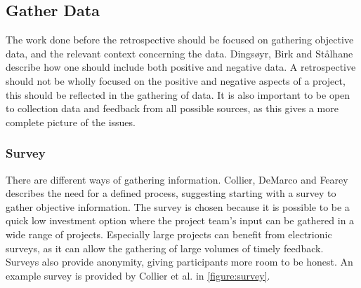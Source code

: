 \documentclass[12pt]{article}
\begin{document}
\subsection{Gather Data}
The work done before the retrospective should be focused on gathering objective data, and the relevant context concerning the data. Dingsøyr, Birk and Stålhane~\cite{Moe2001}  describe how one should include both positive and negative data. A retrospective should not be wholly focused on the positive and negative aspects of a project, this should be reflected in the gathering of data. It is also important to be open to collection data and feedback from all possible sources, as this gives a more complete picture of the issues.

\subsubsection{Survey} There are different ways of gathering information. Collier, DeMarco and Fearey~\cite{Collier1996} describes the need for a defined process, suggesting starting with a survey to gather objective information. The survey is chosen because it is possible to be a quick low investment option where the project team's input can be gathered in a wide range of projects. Especially large projects can benefit from electrionic surveys, as it can allow the gathering of large volumes of timely feedback. Surveys also provide anonymity, giving participants more room to be honest. An example survey is provided by Collier et al. in \autoref{figure:survey}.
\end{document}

